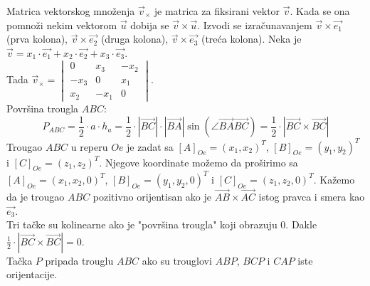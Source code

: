 \documentclass[12pt]{article}
\begin{document}
    Matrica vektorskog množenja $\overrightarrow{v}_\times$ je matrica za fiksirani vektor $\overrightarrow{v}$.
    Kada se ona pomnoži nekim vektorom $\overrightarrow{u}$ dobija se $\overrightarrow{v}\times\overrightarrow{u}$.
    Izvodi se izračunavanjem $\overrightarrow{v}\times\overrightarrow{e_1}$ (prva kolona), $\overrightarrow{v}\times\overrightarrow{e_2}$ (druga kolona), $\overrightarrow{v}\times\overrightarrow{e_3}$ (treća kolona).
    Neka je $\overrightarrow{v}=x_1\cdot\overrightarrow{e_1}+x_2\cdot\overrightarrow{e_2}+x_3\cdot\overrightarrow{e_3}$.\\
    Tada  $\overrightarrow{v}_\times= \begin{vmatrix}
    0    & x_3  & -x_2 \\
    -x_3 & 0    & x_1  \\
    x_2  & -x_1 & 0
\end{vmatrix}$.\\
    Površina trougla $ABC$:
    $$P_{ABC}=\frac{1}{2}\cdot a\cdot h_a=\frac{1}{2}\cdot |\overrightarrow{BC}|\cdot|\overrightarrow{BA}|\sin(\angle\overrightarrow{BA}\overrightarrow{BC})=\frac{1}{2}\cdot |\overrightarrow{BC}\times\overrightarrow{BC}|$$
    Trougao $ABC$ u reperu $Oe$ je zadat sa $[A]_{Oe}=(x_1,x_2)^T$, $[B]_{Oe}=(y_1,y_2)^T$ i $[C]_{Oe}=(z_1,z_2)^T$.
    Njegove koordinate možemo da proširimo sa $[A]_{Oe}=(x_1,x_2,0)^T$, $[B]_{Oe}=(y_1,y_2,0)^T$ i $[C]_{Oe}=(z_1,z_2,0)^T$.
    Kažemo da je trougao $ABC$ pozitivno orijentisan ako je
$\overrightarrow{AB}\times\overrightarrow{AC}$ istog pravca i smera kao $\overrightarrow{e_3}$.\\
    Tri tačke su kolinearne ako je "površina trougla" koji obrazuju 0.
    Dakle $\frac{1}{2}\cdot |\overrightarrow{BC}\times\overrightarrow{BC}|=0$.\\
    Tačka $P$ pripada trouglu $ABC$ ako su trouglovi $ABP$, $BCP$ i $CAP$ iste orijentacije.
    \par
\end{document}
